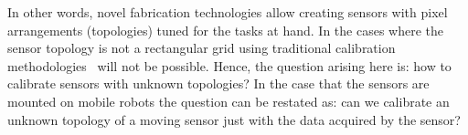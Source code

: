 In other words, novel fabrication technologies allow creating sensors with pixel arrangements (topologies) tuned for the tasks at hand.
In the cases where the sensor topology is not a rectangular grid using traditional calibration methodologies~\cite{Agapito99,Zhang99,Sinha04} will not be possible.
%
Hence, the question arising here is: how to calibrate sensors with unknown topologies?
%
%
In the case that the sensors are mounted on mobile robots the question can be restated as: can we calibrate an unknown topology of a moving sensor just with the data acquired by the sensor? 

